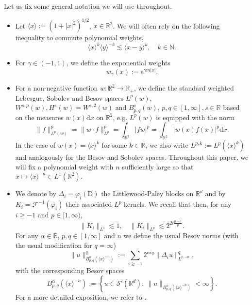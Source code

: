 \documentclass[11pt, a4paper]{scrartcl}
\numberwithin{equation}{section}
\theoremstyle{plain}
\theoremstyle{remark}
\newcommand{\assign}{:=}
\newcommand{\mathD}{\mathrm{D}}
\newcommand{\mathd}{\mathrm{d}}
\newcommand{\mathe}{\mathrm{e}}
\begin{document}
Let us fix some general notation we will use throughout.
\begin{itemize}
	\item Let $\langle x \rangle \assign (1 + | x |^2)^{1 / 2}$, $x \in
		      \mathbb{R}^2$. We will often rely on the following inequality to commute
	      polynomial weights,
	      \begin{equation}
		      \langle x \rangle^k \langle y \rangle^{- k} \lesssim \langle x - y
		      \rangle^k, \quad k \in \mathbb{N}. \label{eq:jpb-triangle-ineq}
	      \end{equation}
	\item  For $\gamma \in (- 1, 1)$, we define the exponential weights
	      \[ w_{\gamma} (x) \assign \mathe^{\gamma m | x |} . \]
	\item For a non-negative function $w : \mathbb{R}^2 \rightarrow \mathbb{R}_+$, we define
	      the standard weighted Lebesgue, Sobolev and Besov spaces $L^p (w)$, $W^{s,
				      p} (w), H^s (w) = W^{s, 2} (w)$ and $B^s_{p, q} (w)$, $p, q \in [1, \infty],
		      s \in \mathbb{R}$ based on the measures $w (x) \mathd x$ on $\mathbb{R}^2$,
	      e.g. $L^p (w)$ is equipped with the norm
	      \[ \| f \|_{L^p(w)}^p = \| w \cdot f \|_{L^p}^p = \int_{\mathbb{R}^2} | fw |^p
		      = \int_{\mathbb{R}^2} | w (x) f (x) |^p \mathd x. \]
	      In the case of $w (x) = \langle x \rangle^k$ for some $k \in \mathbb{R}$, we
	      also write $L^{p, k} \assign L^p (\langle x \rangle^k)$ and analogously for
	      the Besov and Sobolev spaces. Throughout this paper, we will fix
	      a polynomial weight with $n$ sufficiently large so that $x \mapsto \langle x
		      \rangle^{- n} \in L^1 (\mathbb{R}^2)$.

	\item We denote by $\Delta_i = \varphi_i (\mathD)$ the Littlewood-Paley
	      blocks on $\mathbb{R}^d$ and by $K_i = \mathcal{F}^{- 1} (\varphi_i)$ their
	      associated $L^p$-kernels. We recall that then, for any $i \geqslant - 1$ and
	      $p \in [1, \infty)$,
	      \begin{equation}
		      \| K_i \|_{L^1} \lesssim 1, \quad \| K_i \|_{L^p} \lesssim 2^{2 i \frac{p
					      - 1}{p}} . \label{eq:LP-kernels}
	      \end{equation}
	      For any $\alpha \in \mathbb{R}$, $p, q \in [1, \infty]$ and $n$ we define
	      the usual Besov norms (with the usual modification for $q=\infty$)
	      \[ \| u \|^q_{B_{p, q}^{\alpha} (\langle x \rangle^{- n})} \assign \sum_{i
			      \geqslant - 1} 2^{\alpha iq} \| \Delta_i u \|^q_{L^{p, - n}}, \]
	      with the corresponding Besov spaces \[B^{\alpha}_{p, q} (\langle x \rangle^{-
			      n}) \assign \left\{ u \in \mathcal{S}' (\mathbb{R}^d) : \: \| u
		      \|_{B^{\alpha}_{p, q} (\langle x \rangle^{- n})} < \infty \right\}.\] For a
	      more detailed exposition, we refer to {\cite[Chapter
				      1]{bahouriFourierAnalysisNonlinear2011}}.


\end{itemize}
\end{document}

